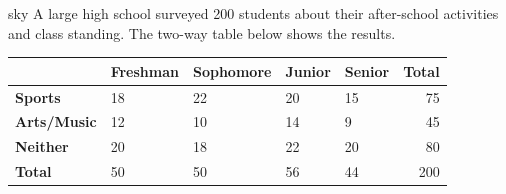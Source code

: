 \documentclass[10pt]{article}
\begin{document}
\namepartnerperiod

\vspace{0.1in}

\begin{scenariobox}[Context]{sky}
\small
A large high school surveyed 200 students about their after-school activities and
class standing. The two-way table below shows the results.

\vspace{6pt}
\renewcommand{\arraystretch}{1.4}
\begin{tabularx}{\linewidth}{@{} l *{4}{X} r @{}}
 & \textbf{Freshman} & \textbf{Sophomore} & \textbf{Junior} & \textbf{Senior} & \textbf{Total} \\
\hline
\textbf{Sports}    & 18 & 22 & 20 & 15 & 75  \\
\textbf{Arts/Music}& 12 & 10 & 14 & 9  & 45  \\
\textbf{Neither}   & 20 & 18 & 22 & 20 & 80  \\
\hline
\textbf{Total}     & 50 & 50 & 56 & 44 & 200 \\
\end{tabularx}
\end{scenariobox}

\vspace{0.12in}
\end{document}

